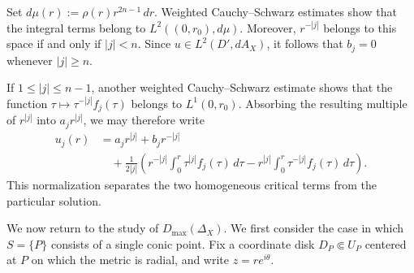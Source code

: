 \documentclass[12pt]{amsart}
\theoremstyle{plain}
\theoremstyle{definition}
\theoremstyle{remark}
\numberwithin{equation}{section} \numberwithin{figure}{section}
\begin{document}
Set \(d\mu(r):=\rho(r)r^{2n-1}\,dr\). Weighted Cauchy--Schwarz
estimates show that the integral terms belong to
\(L^2((0,r_0),d\mu)\). Moreover, \(r^{-|j|}\) belongs to this space
if and only if \(|j|<n\). Since
\(u\in L^2(D',dA_X)\), it follows that \(b_j=0\) whenever
\(|j|\geq n\).

If \(1\leq |j|\leq n-1\), another weighted Cauchy--Schwarz estimate
shows that the function
\(\tau\mapsto\tau^{-|j|}f_j(\tau)\) belongs to \(L^1(0,r_0)\).
Absorbing the resulting multiple of \(r^{|j|}\) into
\(a_jr^{|j|}\), we may therefore write
\[
\begin{aligned}
u_j(r)
&=
a_jr^{|j|}+b_jr^{-|j|} \\
&\quad+
\frac{1}{2|j|}
\left(
r^{-|j|}\int_0^r\tau^{|j|}f_j(\tau)\,d\tau
-
r^{|j|}\int_0^r\tau^{-|j|}f_j(\tau)\,d\tau
\right).
\end{aligned}
\]
This normalization separates the two homogeneous critical terms from
the particular solution.


We now return to the study of \(D_{\max}(\Delta_X)\). We first consider
the case in which \(S=\{P\}\) consists of a single conic point. Fix a
coordinate disk \(D_P\Subset U_P\) centered at \(P\) on which the metric
is radial, and write \(z=re^{i\theta}\).
\end{document}
